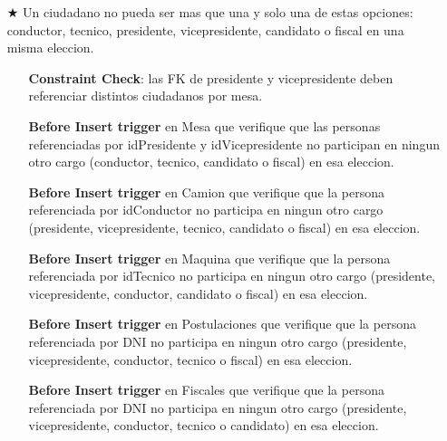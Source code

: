 \vspace{1.2cm}
\begin{itemize}
		\item[$\bigstar$] Un ciudadano no pueda ser mas que una y solo una de estas opciones: conductor, tecnico, presidente, vicepresidente, candidato o fiscal en una misma eleccion.
		\begin{itemize}
			\item[\Checkmark] \textbf{Constraint Check}: las FK de presidente y vicepresidente deben referenciar distintos ciudadanos por mesa.
			
			\item[\Checkmark] \textbf{Before Insert trigger} en Mesa que verifique que las personas referenciadas por idPresidente y idVicepresidente no participan en ningun otro cargo (conductor, tecnico, candidato o fiscal) en esa eleccion.
			
			\item[\Checkmark] \textbf{Before Insert trigger} en Camion que verifique que la persona referenciada por idConductor no participa en ningun otro cargo (presidente, vicepresidente, tecnico, candidato o fiscal) en esa eleccion.

			\item[\Checkmark] \textbf{Before Insert trigger} en Maquina que verifique que la persona referenciada por idTecnico no participa en ningun otro cargo (presidente, vicepresidente, conductor, candidato o fiscal) en esa eleccion.

			\item[\Checkmark] \textbf{Before Insert trigger} en Postulaciones que verifique que la persona referenciada por DNI no participa en ningun otro cargo (presidente, vicepresidente, conductor, tecnico o fiscal) en esa eleccion.

			\item[\Checkmark] \textbf{Before Insert trigger} en Fiscales que verifique que la persona referenciada por DNI no participa en ningun otro cargo (presidente, vicepresidente, conductor, tecnico o candidato) en esa eleccion.
		\end{itemize}	
\end{itemize}
\vspace{1.2cm}
